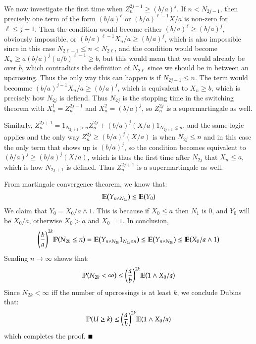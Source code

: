 \documentclass[12pt]{article}
\theoremstyle{definitionstyle}
\newcommand{\1}{\mathds 1}
\renewcommand{\P}{\mathbb P \qty}
\newcommand{\E}{\mathbb E \qty}
\begin{document}
\begin{enumerate}
        We now investigate the first time when $Z^{2j-1}_n \geq (b/a)^j$. If $n < N_{2j-1}$, then precisely one term of the form $(b/a)^\ell$ or $(b/a)^{\ell-1} X/a$ is non-zero for $\ell \leq j-1$. Then the condition would become either $(b/a)^\ell \geq (b/a)^j$, obviously impossible, or $(b/a)^{\ell-1} X_n/a \geq (b/a)^j$, which is also impossible since in this case $N_{2\ell-1} \leq n < N_{2\ell}$, and the condition would become $X_n \geq a (b/a)^j (a/b)^{\ell-1} \geq b$, but this would mean that we would already be over $b$, which contradicts the definition of $N_{2\ell}$ since we should be in between an upcrossing. Thus the only way this can happen is if $N_{2j-1} \leq n$. The term would becomme $(b/a)^{j-1} X_n/a \geq (b/a)^j$, which is equivalent to $X_n \geq b$, which is precisely how $N_{2j}$ is defiend. Thus $N_{2j}$ is the stopping time in the switching theorem with $X^1_n = Z^{2j-1}_n$ and $X^2_n = (b/a)^j$, so $Z^{2j}_n$ is a supermartingale as well. 

        Similarly, $Z^{2j+1}_n = 1_{N_{2j+1} > n} Z^{2j}_n + (b/a)^{j} (X/a) 1_{N_{2j+1} \leq n}$, and the same logic applies and the only way $Z^{2j}_n \geq (b/a)^j (X/a)$ is when $N_{2j} \leq n$ and in this case the only term that shows up is $(b/a)^j$, so the condition becomes equivalent to $(b/a)^j \geq (b/a)^j (X/a)$, which is thus the first time after $N_{2j}$ that $X_n \leq a$, which is how $N_{2j+1}$ is defined. Thus $Z^{2j+1}_n$ is a supermartingale as well.

        From martingale convergence theorem, we know that:
        \begin{align*}
            \E(Y_{n \land N_{2k}}) \leq \E(Y_0)
        \end{align*}
        We claim that $Y_0 = X_0 / a \land 1$. This is because if $X_0 \leq a$ then $N_1$ is 0, and $Y_0$ will be $X_0/a$, otherwise $X_0 > a$ and $X_0 = 1$. In conclusion,
        \begin{align*}
            \qty(\frac{b}{a})^{2k} \P(N_{2k} \leq n) = \E(Y_{n \land N_{2k}} 1_{N_{2k} \leq n}) \leq \E(Y_{n \land N_{2k}}) \leq \E(X_0/a \land 1)
        \end{align*}
        Sending $n \to \infty$ shows that:
        \begin{align*}
            \P(N_{2k} < \infty) \leq \qty(\frac{a}{b})^{2k} \E(1 \land X_0/a)
        \end{align*}
        Since $N_{2k} < \infty$ iff the number of upcrossings is at least $k$, we conclude Dubins that:
        \begin{align*}
            \P(U \geq k) \leq \qty(\frac{a}{b})^{2k} \E(1 \land X_0/a)
        \end{align*}
        which completes the proof. $\hfill \blacksquare$
    \end{enumerate}
\end{document}
